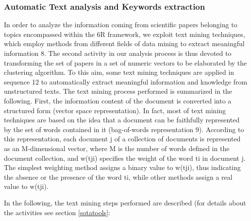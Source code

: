 \documentclass[b5paper,]{book}
\theoremstyle{definition}
\theoremstyle{definition}
\theoremstyle{definition}
\theoremstyle{remark}
\begin{document}
\subsubsection*{Automatic Text analysis and Keywords
extraction}\label{automatic-text-analysis-and-keywords-extraction}

In order to analyze the information coming from scientific papers
belonging to topics encompassed within the 6R framework, we exploit text
mining techniques, which employ methods from different fields of data
mining to extract meaningful information 8. The second activity in our
analysis process is thus devoted to transforming the set of papers in a
set of numeric vectors to be elaborated by the clustering algorithm. To
this aim, some text mining techniques are applied in sequence 12 to
automatically extract meaningful information and knowledge from
unstructured texts. The text mining process performed is summarized in
the following. First, the information content of the document is
converted into a structured form (vector space representation). In fact,
most of text mining techniques are based on the idea that a document can
be faithfully represented by the set of words contained in it
(bag-of-words representation 9). According to this representation, each
document j of a collection of documents is represented as an
M-dimensional vector, where M is the number of words defined in the
document collection, and w(tji) specifies the weight of the word ti in
document j. The simplest weighting method assigns a binary value to
w(tji), thus indicating the absence or the presence of the word ti,
while other methods assign a real value to w(tji).

In the following, the text mining steps performed are described (for
details about the activities see section \ref{sotatools}:
\end{document}
